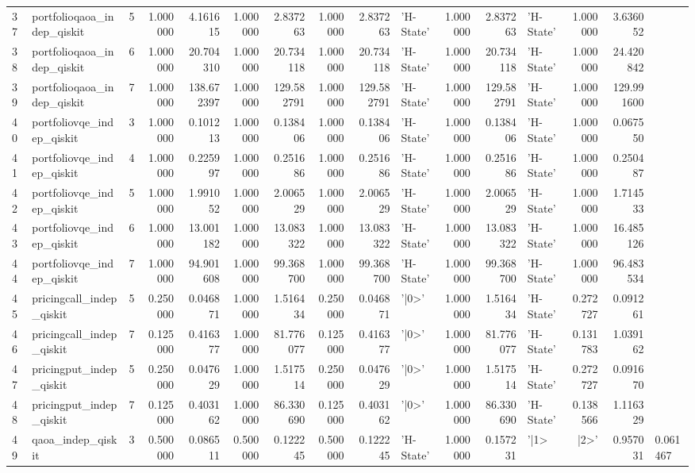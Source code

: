 \begin{table}
\begin{tabular}{llrrrrrrrlrrlrr}
37 & portfolioqaoa_indep_qiskit & 5 & 1.000000 & 4.161615 & 1.000000 & 2.837263 & 1.000000 & 2.837263 & 'H-State' & 1.000000 & 2.837263 & 'H-State' & 1.000000 & 3.636052 \\
38 & portfolioqaoa_indep_qiskit & 6 & 1.000000 & 20.704310 & 1.000000 & 20.734118 & 1.000000 & 20.734118 & 'H-State' & 1.000000 & 20.734118 & 'H-State' & 1.000000 & 24.420842 \\
39 & portfolioqaoa_indep_qiskit & 7 & 1.000000 & 138.672397 & 1.000000 & 129.582791 & 1.000000 & 129.582791 & 'H-State' & 1.000000 & 129.582791 & 'H-State' & 1.000000 & 129.991600 \\
40 & portfoliovqe_indep_qiskit & 3 & 1.000000 & 0.101213 & 1.000000 & 0.138406 & 1.000000 & 0.138406 & 'H-State' & 1.000000 & 0.138406 & 'H-State' & 1.000000 & 0.067550 \\
41 & portfoliovqe_indep_qiskit & 4 & 1.000000 & 0.225997 & 1.000000 & 0.251686 & 1.000000 & 0.251686 & 'H-State' & 1.000000 & 0.251686 & 'H-State' & 1.000000 & 0.250487 \\
42 & portfoliovqe_indep_qiskit & 5 & 1.000000 & 1.991052 & 1.000000 & 2.006529 & 1.000000 & 2.006529 & 'H-State' & 1.000000 & 2.006529 & 'H-State' & 1.000000 & 1.714533 \\
43 & portfoliovqe_indep_qiskit & 6 & 1.000000 & 13.001182 & 1.000000 & 13.083322 & 1.000000 & 13.083322 & 'H-State' & 1.000000 & 13.083322 & 'H-State' & 1.000000 & 16.485126 \\
44 & portfoliovqe_indep_qiskit & 7 & 1.000000 & 94.901608 & 1.000000 & 99.368700 & 1.000000 & 99.368700 & 'H-State' & 1.000000 & 99.368700 & 'H-State' & 1.000000 & 96.483534 \\
45 & pricingcall_indep_qiskit & 5 & 0.250000 & 0.046871 & 1.000000 & 1.516434 & 0.250000 & 0.046871 & '|0>' & 1.000000 & 1.516434 & 'H-State' & 0.272727 & 0.091261 \\
46 & pricingcall_indep_qiskit & 7 & 0.125000 & 0.416377 & 1.000000 & 81.776077 & 0.125000 & 0.416377 & '|0>' & 1.000000 & 81.776077 & 'H-State' & 0.131783 & 1.039162 \\
47 & pricingput_indep_qiskit & 5 & 0.250000 & 0.047629 & 1.000000 & 1.517514 & 0.250000 & 0.047629 & '|0>' & 1.000000 & 1.517514 & 'H-State' & 0.272727 & 0.091670 \\
48 & pricingput_indep_qiskit & 7 & 0.125000 & 0.403162 & 1.000000 & 86.330690 & 0.125000 & 0.403162 & '|0>' & 1.000000 & 86.330690 & 'H-State' & 0.138566 & 1.116329 \\
49 & qaoa_indep_qiskit & 3 & 0.500000 & 0.086511 & 0.500000 & 0.122245 & 0.500000 & 0.122245 & 'H-State' & 1.000000 & 0.157231 & '|1> & |2>' & 0.957031 & 0.061467 \\

\end{tabular}
\end{table}

